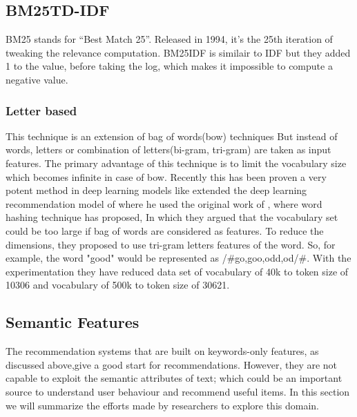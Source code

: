 \subsection{BM25TD-IDF}
BM25 stands for “Best Match 25”. Released in 1994, it’s the 25th iteration of tweaking the relevance computation.
BM25IDF is similair to IDF but they added 1 to the value, before taking the log, which makes it impossible to compute a negative value.
\cite{N50}


\subsubsection{Letter based}
This technique is an extension of bag of words(bow) techniques But instead of words, letters or combination of letters(bi-gram, tri-gram) are taken as input features. The primary advantage of this technique is to limit the vocabulary size which becomes infinite in case of bow. Recently this has been proven a very potent method in deep learning models like
\cite{N62} extended the deep learning recommendation model of \cite{N64} where he used the original work of \cite{N63}, where word hashing technique has proposed, In which they argued that the vocabulary set could be too large if bag of words are considered as features. To reduce the dimensions, they proposed to use tri-gram letters features of the word. So, for example, the word "good" would be represented as /#go,goo,odd,od/#. With the experimentation they have reduced data set of vocabulary of 40k to token size of 10306 and vocabulary of 500k to token size of 30621.
\subsection{Semantic Features}
The recommendation systems that are built on keywords-only features, as discussed above,give a good start for recommendations. However, they are not capable to exploit the semantic attributes of text; which could be an important source to understand user behaviour and recommend useful items. In this section we will summarize the efforts made by researchers to explore this domain. 




